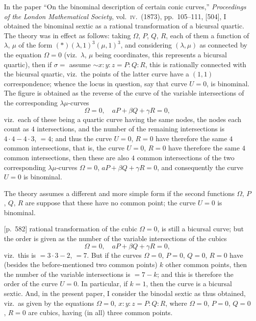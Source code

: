 \documentclass[11pt,a4paper]{book}
\begin{document}
\bigskip

In the paper ``On the binominal description of certain conic curves,'' \textit{Proceedings of the London Mathematical Society}, vol.\ \textsc{iv}.\ (1873), pp.~105--111, [504], I obtained the binominal sextic as a rational transformation of a bicursal quartic. The theory was in effect as follows: taking $\Omega$, $P$, $Q$, $R$, each of them a function of $\lambda$, $\mu$ of the form $(*)(\lambda, 1)^3 (\mu, 1)^3$, and considering $(\lambda, \mu)$ as connected by the equation $\Omega = 0$ (viz.\ $\lambda$, $\mu$ being coordinates, this represents a bicursal quartic), then if $\sigma = $ assume $\sim x : y : z = P : Q : R$, this is rationally connected with the bicursal quartic, viz.\ the points of the latter curve have a $(1, 1)$ correspondence; whence the locus in question, say that curve $U = 0$, is binominal. The figure is obtained as the reverse of the curve of the variable intersections of the corresponding $\lambda\mu$-curves
\[
\Omega = 0, \quad aP + \beta Q + \gamma R = 0,
\]
viz.\ each of these being a quartic curve having the same nodes, the nodes each count as $4$ intersections, and the number of the remaining intersections is $4 \cdot 4 - 4 \cdot 3$, $= 4$; and thus the curve $U = 0$, $R = 0$ have therefore the same $4$ common intersections, that is, the curve $U = 0$, $R = 0$ have therefore the same $4$ common intersections, then these are also $4$ common intersections of the two corresponding $\lambda\mu$-curves $\Omega = 0$, $aP + \beta Q + \gamma R = 0$, and consequently the curve $U = 0$ is binominal.

The theory assumes a different and more simple form if the second functions $\Omega$, $P$, $Q$, $R$ are suppose that these have no common point; the curve $U = 0$ is binominal.

\bigskip

[p.~582] rational transformation of the cubic $\Omega = 0$, is still a bicursal curve; but the order is given as the number of the variable intersections of the cubics
\[
\Omega = 0, \quad aP + \beta Q + \gamma R = 0,
\]
viz.\ this is $= 3 \cdot 3 - 2$, $= 7$. But if the curves $\Omega = 0$, $P = 0$, $Q = 0$, $R = 0$ have (besides the before-mentioned two common points) $k$ other common points, then the number of the variable intersections is $= 7 - k$; and this is therefore the order of the curve $U = 0$. In particular, if $k = 1$, then the curve is a bicursal sextic. And, in the present paper, I consider the binodal sextic as thus obtained, viz.\ as given by the equations $\Omega = 0$, $x : y : z = P : Q : R$, where $\Omega = 0$, $P = 0$, $Q = 0$, $R = 0$ are cubics, having (in all) three common points.
\end{document}
